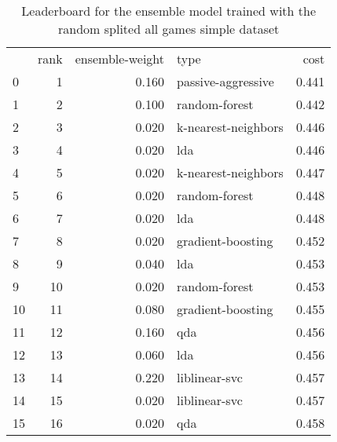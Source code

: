\begin{table}[]
	\centering
	\begin{tabular}{lrrlr}
		   & rank & ensemble-weight & type                & cost  \\
		0  & 1    & 0.160           & passive-aggressive  & 0.441 \\
		1  & 2    & 0.100           & random-forest       & 0.442 \\
		2  & 3    & 0.020           & k-nearest-neighbors & 0.446 \\
		3  & 4    & 0.020           & lda                 & 0.446 \\
		4  & 5    & 0.020           & k-nearest-neighbors & 0.447 \\
		5  & 6    & 0.020           & random-forest       & 0.448 \\
		6  & 7    & 0.020           & lda                 & 0.448 \\
		7  & 8    & 0.020           & gradient-boosting   & 0.452 \\
		8  & 9    & 0.040           & lda                 & 0.453 \\
		9  & 10   & 0.020           & random-forest       & 0.453 \\
		10 & 11   & 0.080           & gradient-boosting   & 0.455 \\
		11 & 12   & 0.160           & qda                 & 0.456 \\
		12 & 13   & 0.060           & lda                 & 0.456 \\
		13 & 14   & 0.220           & liblinear-svc       & 0.457 \\
		14 & 15   & 0.020           & liblinear-svc       & 0.457 \\
		15 & 16   & 0.020           & qda                 & 0.458 \\
	\end{tabular}

	\caption{Leaderboard for the ensemble model trained with the random splited all games simple dataset}
	\label{tab:lb-all-games-simple-v2-randsplit}
\end{table}

